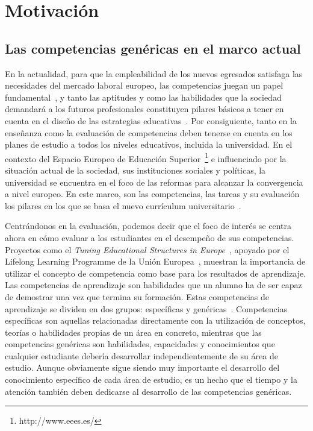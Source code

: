 


\section{Motivación}
\label{sec:Motivation}

\subsection*{Las competencias genéricas en el marco actual}

En la actualidad, para que la empleabilidad de los nuevos egresados satisfaga las necesidades del mercado laboral europeo, las competencias juegan un papel fundamental~\cite{communique2012making}, y tanto las aptitudes y como las habilidades que la sociedad demandará a los futuros profesionales constituyen pilares básicos a tener en cuenta en el diseño de las estrategias educativas~\cite{de2010project}. Por consiguiente, tanto en la enseñanza como la evaluación de competencias deben tenerse en cuenta en los planes de estudio a todos los niveles educativos, incluida la universidad. En el contexto del Espacio Europeo de Educación Superior~\footnote{http://www.eees.es/} e influenciado por la situación actual de  la sociedad, sus instituciones sociales y políticas, la universidad se encuentra en el foco de las reformas para alcanzar la convergencia a nivel europeo. En este marco, son las competencias, las tareas y su evaluación los pilares en los que se basa el nuevo currículum universitario~\cite{zabala2005espacio}.  

Centrándonos en la evaluación, podemos decir que el foco de interés se centra ahora en cómo evaluar a los estudiantes en el desempeño de sus competencias. Proyectos como el \emph{Tuning Educational Structures in Europe}~\cite{gonzalez2003tuning}, apoyado por el Lifelong Learning Programme de la Unión Europea~\cite{llp:2006}, muestran la importancia de utilizar el concepto de competencia como base para los resultados de aprendizaje. Las competencias de aprendizaje son habilidades que un alumno ha de ser capaz de demostrar una vez que termina su formación. Estas competencias de aprendizaje se dividen en dos grupos: específicas y genéricas~\cite{strijbos2015criteria}. Competencias específicas son aquellas relacionadas directamente con la utilización de conceptos, teorías o habilidades propias de un área en concreto, mientras que las competencias genéricas son habilidades, capacidades y conocimientos que cualquier estudiante debería desarrollar independientemente de su área de estudio. Aunque obviamente sigue siendo muy importante el desarrollo del conocimiento específico de cada área de estudio, es un hecho que el tiempo y la atención también deben dedicarse al desarrollo de las competencias genéricas. %

